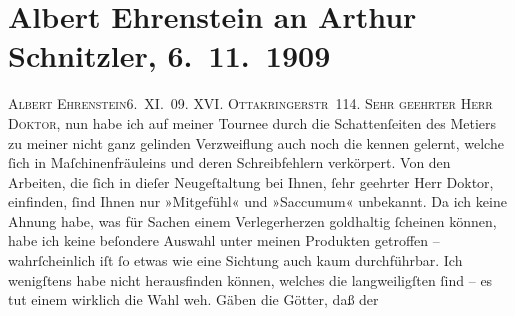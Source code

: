

         
         \renewcommand{\erwaehntePersonen}{Personen: Albert Ehrenstein, Samuel Fischer}
         \renewcommand{\erwaehnteOrte}{Orte: Ottakringerstraße, Wien}
         \renewcommand{\erwaehnteWerke}{Werke: Die neue Rundschau, Mitgefühl, Saccumum}
               \section[Albert Ehrenstein an Arthur Schnitzler, 6. 11. 1909]{ Albert Ehrenstein an Arthur Schnitzler, 6. 11. 1909}\nopagebreak{}\rehead{ }\begin{ledgroupsized}[t]{13cm}\normalsize\beginnumbering \toendnotes[C]{\smallbreak\pagebreak[2]} 
\pstart
           {\pb}\textsc{Albert Ehrenstein}\hfill 6. XI. 09. \pend
           \pstart
           \textsc{XVI. Ottakringerstr 114.}\pend
           \pstart{}\textsc{Sehr geehrter Herr Doktor,}\pend\pstart
           nun habe ich auf meiner Tournee durch die Schattenſeiten des Metiers zu meiner nicht
               ganz gelinden Verzweiflung auch noch die kennen gelernt, welche ſich in
               Maſchinenfräuleins und deren Schreibfehlern verkörpert. Von den Arbeiten, die ſich in
               dieſer Neugeſtaltung bei Ihnen, ſehr geehrter Herr Doktor, einfinden, ſind Ihnen nur
                  »Mitgefühl« und »Saccumum« unbekannt.\pend
           \pstart
           Da ich keine Ahnung habe, was für Sachen einem Verlegerherzen goldhaltig ſcheinen
               können, habe ich keine beſondere Auswahl {\pb}unter meinen Produkten getroffen – wahrſcheinlich iſt ſo etwas wie eine Sichtung
               auch kaum durchführbar. Ich wenigſtens habe nicht herausfinden können, welches die
               langweiligſten ſind – es tut einem wirklich die Wahl weh. Gäben die Götter, daß der

\end{ledgroupsized}
